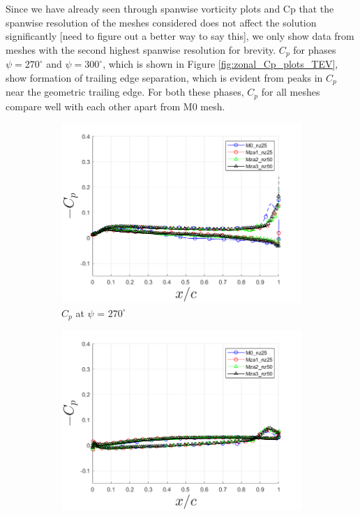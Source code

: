 Since we have already seen through spanwise vorticity plots and Cp that the spanwise resolution of the meshes considered does not affect the solution significantly [need to figure out a better way to say this], we only show data from meshes with the second highest spanwise resolution for brevity. 
$C_p$ for phases $\psi=270^\circ$ and $\psi=300^\circ$, which is shown in Figure \ref{fig:zonal_Cp_plots_TEV}, show formation of trailing edge separation, which is evident from peaks in $C_p$ near the geometric trailing edge. 
For both these phases, $C_p$ for all meshes compare well with each other apart from M0 mesh.


\begin{figure}
\begin{subfigure}[b]{0.475\textwidth}
\centering
\includegraphics[width=1\textwidth]{figures/zonal_adapt_results/Cp/phase_270.png}
\caption{ $C_p$ at $\psi$ = $270^\circ$}
\label{fig:zonal_Cp_270}
\end{subfigure}
\begin{subfigure}[b]{0.475\textwidth}
\centering
\includegraphics[width=1\textwidth]{figures/zonal_adapt_results/Cp/phase_300.png}

\end{subfigure}
\end{figure}
